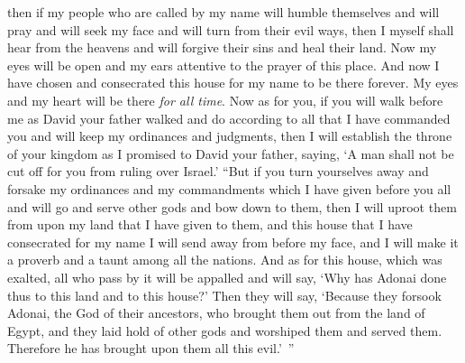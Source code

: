 \begin{biblechapter}
\verse then if my people who are called by my name will humble themselves and will pray and will seek my face and will turn from their evil ways, then I myself shall hear from the heavens and will forgive their sins and heal their land.
\verse Now my eyes will be open and my ears attentive to the prayer of this place.
\verse And now I have chosen and consecrated this house for my name to be there forever. My eyes and my heart will be there \textit{for all time}.
\verse Now as for you, if you will walk before me as David your father walked and do according to all that I have commanded you and will keep my ordinances and judgments,
\verse then I will establish the throne of your kingdom as I promised to David your father, saying, ‘A man shall not be cut off for you from ruling over Israel.’
\verse “But if you turn yourselves away and forsake my ordinances and my commandments which I have given before you all and will go and serve other gods and bow down to them,
\verse then I will uproot them from upon my land that I have given to them, and this house that I have consecrated for my name I will send away from before my face, and I will make it a proverb and a taunt among all the nations.
\verse And as for this house, which was exalted, all who pass by it will be appalled and will say, ‘Why has Adonai done thus to this land and to this house?’
\verse Then they will say, ‘Because they forsook Adonai, the God of their ancestors, who brought them out from the land of Egypt, and they laid hold of other gods and worshiped them and served them. Therefore he has brought upon them all this evil.’ ”
\end{biblechapter}

